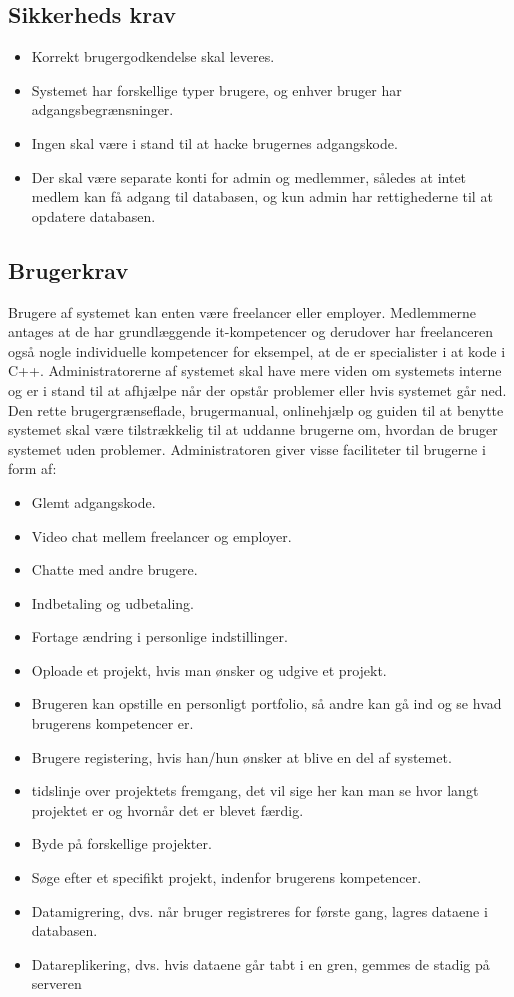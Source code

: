 \subsection{Sikkerheds krav}
\begin{itemize}  
    \item Korrekt brugergodkendelse skal leveres.
    \item Systemet har forskellige typer brugere, og enhver bruger har adgangsbegrænsninger.
    \item Ingen skal være i stand til at hacke brugernes adgangskode.
    \item Der skal være separate konti for admin og medlemmer, således at intet medlem kan få adgang til databasen, og kun admin har rettighederne til at opdatere databasen.
\end{itemize}

\subsection{Brugerkrav}
Brugere af systemet kan enten være freelancer eller employer.  Medlemmerne antages at de har grundlæggende it-kompetencer og derudover har freelanceren også nogle individuelle kompetencer for eksempel, at de er specialister i at kode i C++. Administratorerne af systemet skal have mere viden om systemets interne og er i stand til at afhjælpe når der opstår problemer eller hvis systemet går ned. Den rette brugergrænseflade, brugermanual, onlinehjælp og guiden til at benytte systemet skal være tilstrækkelig til at uddanne brugerne om, hvordan de bruger systemet uden problemer. 
Administratoren giver visse faciliteter til brugerne i form af:

\begin{itemize}  
    \item Glemt adgangskode.
    \item Video chat mellem freelancer og employer.
    \item Chatte med andre brugere.
    \item Indbetaling og udbetaling.
    \item Fortage ændring i personlige indstillinger. 
    \item Oploade et projekt, hvis man ønsker og udgive et projekt. 
    \item Brugeren kan opstille en personligt portfolio, så andre kan  gå ind og se hvad brugerens kompetencer er.
    \item Brugere registering, hvis han/hun ønsker at blive en del af systemet.
    \item tidslinje over projektets fremgang, det vil sige her kan man se hvor langt projektet er og hvornår det er blevet færdig.
    \item Byde på forskellige projekter. 
    \item Søge efter et specifikt projekt, indenfor brugerens kompetencer.  
    \item Datamigrering, dvs. når bruger registreres for første gang, lagres dataene i databasen.
    \item Datareplikering, dvs. hvis dataene går tabt i en gren, gemmes de stadig på serveren
\end{itemize}


